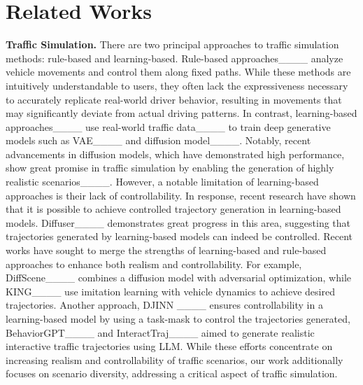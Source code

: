 \section{Related Works}
\noindent
{\bf Traffic Simulation.} There are two principal approaches to traffic simulation methods: rule-based and learning-based. Rule-based approaches____ analyze vehicle movements and control them along fixed paths. While these methods are intuitively understandable to users, they often lack the expressiveness necessary to accurately replicate real-world driver behavior, resulting in movements that may significantly deviate from actual driving patterns. In contrast, learning-based approaches____ use real-world traffic data____ to train deep generative models such as VAE____ and diffusion model____. Notably, recent advancements in diffusion models, which have demonstrated high performance, show great promise in traffic simulation by enabling the generation of highly realistic scenarios____. However, a notable limitation of learning-based approaches is their lack of controllability. In response, recent research have shown that it is possible to achieve controlled trajectory generation in learning-based models. Diffuser____ demonstrates great progress in this area, suggesting that trajectories generated by learning-based models can indeed be controlled. Recent works have sought to merge the strengths of learning-based and rule-based approaches to enhance both realism and controllability. For example, DiffScene____ combines a diffusion model with adversarial optimization, while KING____ use imitation learning with vehicle dynamics to achieve desired trajectories. Another approach, DJINN ____ ensures controllability in a learning-based model by using a task-mask to control the trajectories generated, BehaviorGPT____ and  InteractTraj____ aimed to generate realistic interactive traffic trajectories using LLM. While these efforts concentrate on increasing realism and controllability of traffic scenarios, our work additionally focuses on scenario diversity, addressing a critical aspect of traffic simulation.


